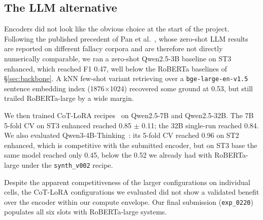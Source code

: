 \subsection{The LLM alternative}
\label{sec:llm-detour}

Encoders did not look like the obvious choice at the start of the project. Following the published precedent of Pan et al.~\cite{pan2024zeroshotfallacy}, whose zero-shot LLM results are reported on different fallacy corpora and are therefore not directly numerically comparable, we ran a zero-shot Qwen2.5-3B baseline on ST3 enhanced, which reached F1 0.47, well below the RoBERTa baselines of \S\ref{sec:backbone}. %
A kNN few-shot variant retrieving over a \texttt{bge-large-en-v1.5} sentence embedding index (1876$\times$1024) recovered some ground at 0.53, but still trailed RoBERTa-large by a wide margin. %

We then trained CoT-LoRA recipes~\cite{hu2022lora,dettmers2023qlora,wei2022cot} on Qwen2.5-7B and Qwen2.5-32B. The 7B 5-fold CV on ST3 enhanced reached 0.85 $\pm$ 0.11; the 32B single-run reached 0.84. %
We also evaluated Qwen3-4B-Thinking~\cite{qwen3}: its 5-fold CV reached 0.96 on ST2 enhanced, which is competitive with the submitted encoder, but on ST3 base the same model reached only 0.45, below the 0.52 we already had with RoBERTa-large under the \texttt{synth\_v002} recipe. %

Despite the apparent competitiveness of the larger configurations on individual cells, the CoT-LoRA configurations we evaluated did not show a validated benefit over the encoder within our compute envelope. Our final submission (\texttt{exp\_0220}) populates all six slots with RoBERTa-large systems. %
